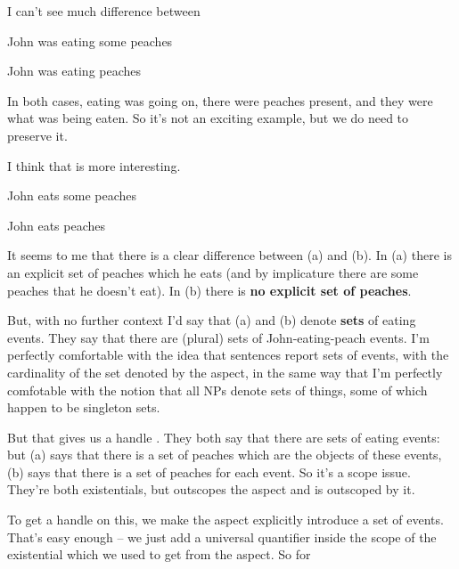 \documentclass[11pt]{article}
\begin{document}
\noindent
I can't see much difference between

\begin{examples}
\item \label{S1}
\begin{examples}
\item
John was eating some peaches 
\item
John was eating peaches
\end{examples}
\end{examples}

\noindent
In both cases, eating was going on, there were peaches present, and
they were what was being eaten. So it's not an exciting example, but
we do need to preserve it.

I think that  is more interesting.

\begin{examples}
\item \label{S2}
\begin{examples}
\item
John eats some peaches 
\item
John eats peaches
\end{examples}
\end{examples}

\noindent
It seems to me that there is a clear difference between (a) and
(b). In (a) there is an explicit set of peaches
which he eats (and by implicature there are some peaches that he
doesn't eat). In (b) there is \textbf{no explicit set of
  peaches}.

But, with no further context I'd say that (a) and
(b) denote \textbf{sets} of eating events. They say that
there are (plural) sets of John-eating-peach events. I'm perfectly
comfortable with the idea that sentences report sets of events, with
the cardinality of the set denoted by the aspect, in the same way that
I'm perfectly comfotable with the notion that all NPs denote sets of
things, some of which happen to be singleton sets.

But that gives us a handle . They both say that there are
sets of eating events: but (a) says that there is a set of
peaches which are the objects of these events, (b) says that
there is a set of peaches for each event. So it's a scope
issue. They're both existentials, but  outscopes the
aspect and  is outscoped by it.

To get a handle on this, we make the aspect explicitly introduce a set
of events. That's easy enough -- we just add a universal quantifier
inside the scope of the existential which we used to get from the
aspect. So for 
\end{document}
